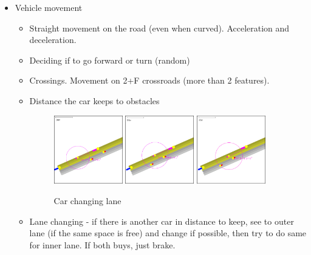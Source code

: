 \begin{itemize}
    \item Vehicle movement
    \begin{itemize}
        \item Straight movement on the road (even when curved). Acceleration and deceleration.
        \item Deciding if to go forward or turn (random)
        \item Crossings. Movement on 2+F crossroads (more than 2 features).
        \item Distance the car keeps to obstacles
            \begin{figure}
                \caption{Car changing lane}
                \label{fig:carKeepingDistance}
                \centering
                \includegraphics[width=0.3\textwidth]{figs/carMovement/car_keeping_distance_to_other.png}
                \hspace{0.2em}
                \includegraphics[width=0.3\textwidth]{figs/carMovement/car_lane_change_before.png}
                \hspace{0.2em}
                \includegraphics[width=0.3\textwidth]{figs/carMovement/car_lane_change_after.png}
            \end{figure}
        \item Lane changing - if there is another car in distance to keep, see to outer lane (if the same space is free) and change if possible, then try to do same for inner lane. If both buys, just brake.
    \end{itemize}

\end{itemize}


